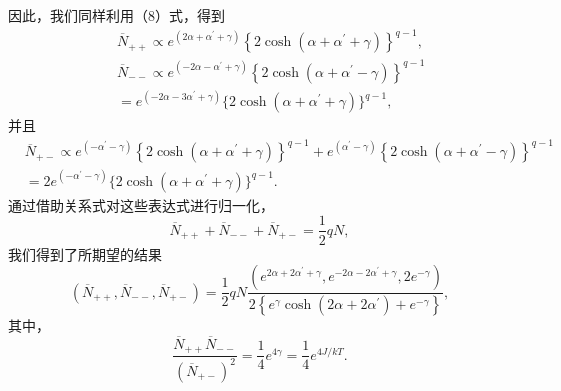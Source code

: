因此，我们同样利用（8）式，得到
\begin{equation}\tag{12.5.51}\label{eq:12.5.51}
\begin{array}{rlr} & { } & { \overline { { N } } _ { + + } \propto e ^{( 2 \alpha + \alpha ^ { \prime} + \gamma ) } \left\{ 2 \cosh ( \alpha + \alpha ^{\prime} + \gamma ) \right\} ^{q - 1} , } \\& { } & { \overline { { N } } _ { -- } \propto e ^{( - 2 \alpha - \alpha ^ { \prime} + \gamma ) } \left\{ 2 \cosh ( \alpha + \alpha ^{\prime} - \gamma ) \right\} ^{q - 1} } \\& { } & { = e ^{( - 2 \alpha - 3 \alpha ^ { \prime} + \gamma ) } \{ 2 \cosh ( \alpha + \alpha ^{\prime} + \gamma ) \} ^{q - 1} , } \end{array}
\end{equation}
并且
\begin{equation}\tag{12.5.52}\label{eq:12.5.52}
\begin{array}{rl} & { \overline { { N } } _ { + - } \propto e ^{( - \alpha ^ { \prime} - \gamma ) } \left\{ 2 \cosh ( \alpha + \alpha ^{\prime} + \gamma ) \right\} ^{q - 1} + e ^{( \alpha ^ { \prime} - \gamma ) } \left\{ 2 \cosh ( \alpha + \alpha ^{\prime} - \gamma ) \right\} ^{q - 1} } \\& {  = 2 e ^{( - \alpha ^ { \prime} - \gamma ) } \{ 2 \cosh ( \alpha + \alpha ^{\prime} + \gamma ) \} ^{q - 1} . } \end{array}
\end{equation}
通过借助关系式对这些表达式进行归一化，
\begin{equation}\tag{12.5.53}\label{eq:12.5.53}
\overline { { N } } _ { + + } + \overline { { N } } _ { -- } + \overline { { N } } _ { + - } = \frac { 1 } { 2 } q N ,
\end{equation}
我们得到了所期望的结果
\begin{equation}\tag{12.5.54}\label{eq:12.5.54}
( \overline { { N } } _ { + + } , \overline { { N } } _ { -- } , \overline { { N } } _ { + - } ) = \frac { 1 } { 2 } q N \frac { \left( e ^{2 \alpha + 2 \alpha ^ { \prime} + \gamma } , e ^{- 2 \alpha - 2 \alpha ^ { \prime} + \gamma } , 2 e ^{- \gamma} \right) } { 2 \left\{ e ^{\gamma} \cosh ( 2 \alpha + 2 \alpha ^{\prime} ) + e ^{- \gamma} \right\} } ,
\end{equation}
其中，
\begin{equation}\tag{12.5.55}\label{eq:12.5.55}
\frac { \overline { { N } } _ { + + } \overline { { N } } _ { -- } } { \left( \overline { { N } } _ { + - } \right) ^{2} } = \frac { 1 } { 4 } e ^{4 \gamma} = \frac { 1 } { 4 } e ^{4 J / k T} .
\end{equation}
